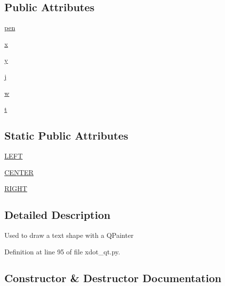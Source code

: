 \subsection*{Public Attributes}
\begin{DoxyCompactItemize}
\item 
\hyperlink{classsmacc__viewer_1_1xdot_1_1xdot__qt_1_1TextShape_aa707273f46372937ec96b59762d82a4f}{pen}
\item 
\hyperlink{classsmacc__viewer_1_1xdot_1_1xdot__qt_1_1TextShape_a5ef1c12aaeabfc80fbe893b6a5f9c3d3}{x}
\item 
\hyperlink{classsmacc__viewer_1_1xdot_1_1xdot__qt_1_1TextShape_ae50d05feb01bc8e1544cb9c8c6a312f1}{y}
\item 
\hyperlink{classsmacc__viewer_1_1xdot_1_1xdot__qt_1_1TextShape_ad6bf2920b8d24b22adcb27df075a1837}{j}
\item 
\hyperlink{classsmacc__viewer_1_1xdot_1_1xdot__qt_1_1TextShape_a7af76f9d10ceafd1209cf7bfce73c7be}{w}
\item 
\hyperlink{classsmacc__viewer_1_1xdot_1_1xdot__qt_1_1TextShape_a355e76c951da6ca7af4a69b6eaeea2e8}{t}
\end{DoxyCompactItemize}
\subsection*{Static Public Attributes}
\begin{DoxyCompactItemize}
\item 
\hyperlink{classsmacc__viewer_1_1xdot_1_1xdot__qt_1_1TextShape_a3fb62ef1a3f452d095335b022907db4c}{L\+E\+FT}
\item 
\hyperlink{classsmacc__viewer_1_1xdot_1_1xdot__qt_1_1TextShape_ad6f41ffdfac878a58ddfc92c2fa069af}{C\+E\+N\+T\+ER}
\item 
\hyperlink{classsmacc__viewer_1_1xdot_1_1xdot__qt_1_1TextShape_a5e272e4c58112130bddcf25c07debdc7}{R\+I\+G\+HT}
\end{DoxyCompactItemize}


\subsection{Detailed Description}
\begin{DoxyVerb}Used to draw a text shape with a QPainter\end{DoxyVerb}
 

Definition at line 95 of file xdot\+\_\+qt.\+py.



\subsection{Constructor \& Destructor Documentation}
